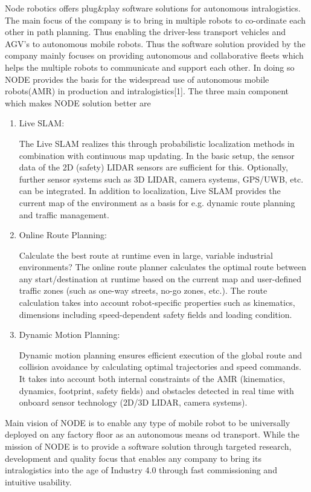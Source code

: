  Node robotics offers plug\&play software solutions for autonomous intralogistics. The main focus of the company is to bring in multiple robots to co-ordinate each other in path planning. Thus enabling the driver-less transport vehicles and AGV's to autonomous mobile robots. Thus the software solution provided by the company mainly focuses on providing autonomous and collaborative fleets which helps the multiple robots to communicate and support each other. In doing so NODE provides the basis for the widespread use of autonomous mobile robots(AMR) in production and intralogistics[1].
 The three main component which makes NODE solution better are
 \begin{enumerate}
 	\item Live SLAM:
 	
 	The Live SLAM realizes this through probabilistic localization methods in combination with continuous map updating. In the basic setup, the sensor data of the 2D (safety) LIDAR sensors are sufficient for this. Optionally, further sensor systems such as 3D LIDAR, camera systems, GPS/UWB, etc. can be integrated. In addition to localization, Live SLAM provides the current map of the environment as a basis for e.g. dynamic route planning and traffic management. 
 	\item Online Route Planning:
 	
 	Calculate the best route at runtime even in large, variable industrial environments? The online route planner calculates the optimal route between any start/destination at runtime based on the current map and user-defined traffic zones (such as one-way streets, no-go zones, etc.). The route calculation takes into account robot-specific properties such as kinematics, dimensions including speed-dependent safety fields and loading condition.
 	
 	\item Dynamic Motion Planning:
 	
 	 Dynamic motion planning ensures efficient execution of the global route and collision avoidance by calculating optimal trajectories and speed commands. It takes into account both internal constraints of the AMR (kinematics, dynamics, footprint, safety fields) and obstacles detected in real time with onboard sensor technology (2D/3D LIDAR, camera systems).
 \end{enumerate}

 Main vision of NODE is to enable any type of mobile robot to be universally deployed on any factory floor as an autonomous means od transport. While the mission of NODE is to provide a software solution through targeted research, development and quality focus that enables any company to bring its intralogistics into the age of Industry 4.0 through fast commissioning and intuitive usability.
 
